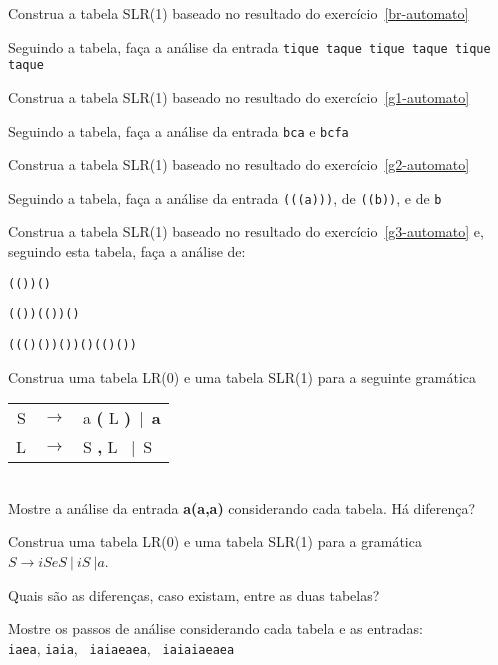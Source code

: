 \documentclass{compiladores}
\begin{document}
\begin{listanumerada}
\item Construa a tabela SLR(1) baseado no resultado do exercício~\ref{br-automato}
  \begin{lista}
    \item Seguindo a tabela, faça a análise da entrada \texttt{tique taque tique taque tique taque}
  \end{lista}
\item Construa a tabela SLR(1) baseado no resultado do exercício~\ref{g1-automato}
  \begin{lista}
    \item Seguindo a tabela, faça a análise da entrada \texttt{bca} e \texttt{bcfa}
  \end{lista}
\item Construa a tabela SLR(1) baseado no resultado do exercício~\ref{g2-automato}
  \begin{lista}
    \item Seguindo a tabela, faça a análise da entrada  \texttt{(((a)))}, de \texttt{((b))}, e de \texttt{b}
  \end{lista}
\item Construa a tabela SLR(1) baseado no resultado do exercício~\ref{g3-automato} e, seguindo esta tabela, faça a análise de:
  \begin{lista}
    \item \texttt{(())()}
    \item \texttt{(())(())()}
    \item \texttt{((()())())()(()())}
  \end{lista}

\item Construa uma tabela LR(0) e uma tabela SLR(1) para a seguinte gramática \\
     \begin{tabular}{rcl}
     S & $\rightarrow$ & a \textbf( L \textbf)\ |\ \textbf{a} \\
     L & $\rightarrow$ & S \textbf, L \ |\ S \\
     \end{tabular} \\
     Mostre a análise da entrada {\bf a(a,a)} considerando cada tabela. Há diferença?

\item Construa uma tabela LR(0) e uma tabela SLR(1) para a gramática
  $S \rightarrow iSeS\ |\ iS\ | a$. 
  \begin{lista}
    \item Quais são as diferenças, caso existam, entre as duas tabelas?
    \item Mostre os passos de análise considerando cada tabela e as entradas: \\
      \texttt{iaea}, \texttt{iaia}, \texttt{ iaiaeaea}, \texttt{ iaiaiaeaea}
  \end{lista}


\end{listanumerada}
\end{document}
